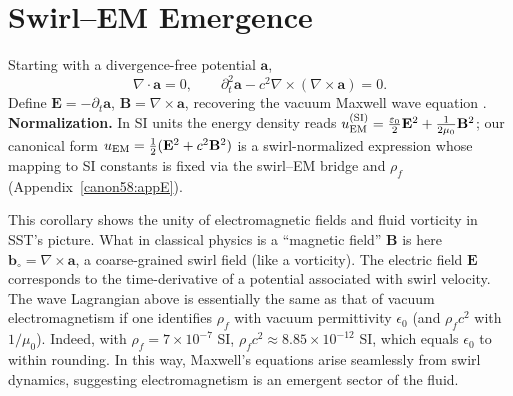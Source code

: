 \documentclass[reprint,aps,onecolumn,nofootinbib]{revtex4-2}
\begin{document}
    \section{Swirl--EM Emergence}\label{canon58:swirl-em}
    Starting with a divergence-free potential $\mathbf a$,
    \[
        \nabla\cdot\mathbf a = 0,\qquad
        \partial_t^2\mathbf a - c^2\nabla\times(\nabla\times\mathbf a)=0.
    \]
    Define $\mathbf E=-\partial_t\mathbf a$, $\mathbf B=\nabla\times\mathbf a$, recovering the vacuum Maxwell wave equation \cite{Jackson1999}.
    \textbf{Normalization.} In SI units the energy density reads
    $u_{\rm EM}^{\rm (SI)}=\tfrac{\varepsilon_0}{2}\mathbf E^2+\tfrac{1}{2\mu_0}\mathbf B^2$;
    our canonical form $u_{\rm EM}=\tfrac12(\mathbf E^2+c^2\mathbf B^2)$ is a
    swirl-normalized expression whose mapping to SI constants is fixed via the swirl–EM bridge and $\rho_f$ (Appendix~\ref{canon58:appE}). %

	\noindent This corollary shows the unity of electromagnetic fields and fluid vorticity in SST’s picture. What in classical physics is a “magnetic field” $\mathbf{B}$ is here $\mathbf{b}_{\circ} = \nabla\times \mathbf{a}$, a coarse-grained swirl field (like a vorticity). The electric field $\mathbf{E}$ corresponds to the time-derivative of a potential associated with swirl velocity. The wave Lagrangian above is essentially the same as that of vacuum electromagnetism if one identifies $\rho_f$ with vacuum permittivity $\epsilon_0$ (and $\rho_f c^2$ with $1/\mu_0$). Indeed, with $\rho_f = 7\times10^{-7}$ SI, $\rho_f c^2 \approx 8.85\times10^{-12}$ SI, which equals $\epsilon_0$ to within rounding. In this way, Maxwell’s equations arise seamlessly from swirl dynamics, suggesting electromagnetism is an emergent sector of the fluid.



\end{document}
